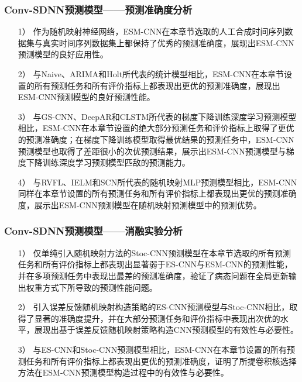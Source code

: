\begin{frame}
    \frametitle{Conv-SDNN预测模型——预测准确度分析}

    \begin{enumerate}
        \item[1）]  作为随机映射神经网络，ESM-CNN在本章节选取的人工合成时间序列数据集与真实时间序列数据集上都保持了优秀的预测准确度，展现出ESM-CNN预测模型的良好应用性。
        \item[2）] 与Naive、ARIMA和Holt所代表的统计模型相比，ESM-CNN在本章节设置的所有预测任务和所有评价指标上都表现出更优的预测准确度，展现出ESM-CNN预测模型的良好预测性能。
        \item[3）] 与GS-CNN、DeepAR和CLSTM所代表的梯度下降训练深度学习预测模型相比，ESM-CNN在本章节设置的绝大部分预测任务和评价指标上取得了更优的预测准确度；在梯度下降训练模型取得最优结果的预测任务中，ESM-CNN预测模型也取得了差距很小的次优预测结果，展示出ESM-CNN预测模型与梯度下降训练深度学习预测模型匹敌的预测能力。
        \item[4）] 与RVFL、IELM和SCN所代表的随机映射MLP预测模型相比，ESM-CNN同样在本章节设置的所有预测任务和所有评价指标上都表现出更优的预测准确度，展示出ESM-CNN预测模型在随机映射预测模型中的预测优势。
    \end{enumerate}

\end{frame}



\begin{frame}
    \frametitle{Conv-SDNN预测模型——消融实验分析}

    \begin{enumerate}
        \item[1）] 仅单纯引入随机映射方法的Stoc-CNN预测模型在本章节选取的所有预测任务和所有评价指标上都表现出显著弱于ES-CNN与ESM-CNN的预测性能，并在多项预测任务中表现出最差的预测准确度，验证了病态问题在全局更新输出权重方式下所导致的预测性能问题。
        \item[2）] 引入误差反馈随机映射构造策略的ES-CNN预测模型与Stoc-CNN相比，取得了显著的准确度提升，并在大部分预测任务和评价指标中表现出次优的水平，展现出基于误差反馈随机映射策略构造CNN预测模型的有效性与必要性。
        \item[3）] 与ES-CNN和Stoc-CNN预测模型相比，ESM-CNN在本章节设置的所有预测任务和所有评价指标上都表现出更优的预测准确度，证明了所提卷积核选择方法在ESM-CNN预测模型构造过程中的有效性与必要性。
    \end{enumerate}

\end{frame}

